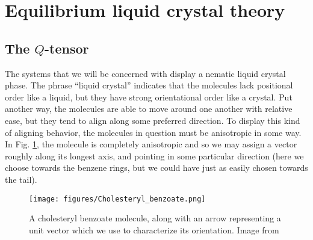 \documentclass[reqno]{article}
\begin{document}
	\section{Equilibrium liquid crystal theory}
	\subsection{The $Q$-tensor}
  The systems that we will be concerned with display a nematic liquid crystal phase.
  The phrase ``liquid crystal'' indicates that the molecules lack positional
  order like a liquid, but they have strong orientational order like a crystal.
  Put another way, the molecules are able to move around one another with
  relative ease, but they tend to align along some preferred direction.
  To display this kind of aligning behavior, the molecules in question must be
  anisotropic in some way.
  In Fig. \ref{fig:cholesteryl-benzoate}, the molecule is completely anisotropic and so we may
  assign a vector roughly along its longest axis, and pointing in some
  particular direction (here we choose towards the benzene rings, but we could
  have just as easily chosen towards the tail).
  \begin{figure}[h] 
    \centering
    \texttt{[image: figures/Cholesteryl\_benzoate.png]}
    \caption{A cholesteryl benzoate molecule, along with an arrow representing
      a unit vector which we use to characterize its orientation. Image from
      ~\cite{cholesteryl-benzoate}}
    \label{fig:cholesteryl-benzoate}
  \end{figure}
\end{document}
